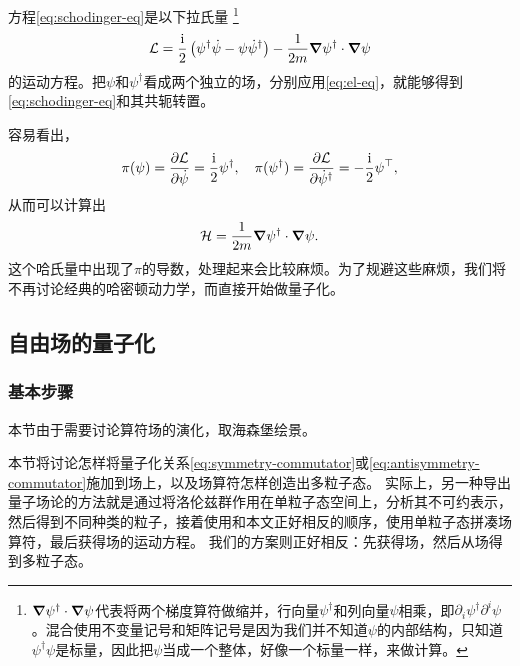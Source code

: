 \documentclass[hyperref, UTF8, a4paper]{ctexart}
\newcommand*{\ii}{\mathrm{i}}
\begin{document}
方程\eqref{eq:schodinger-eq}是以下拉氏量%
\footnote{$\grad{\psi}^\dagger \cdot \grad{\psi}$代表将两个梯度算符做缩并，行向量$\psi^\dagger$和列向量$\psi$相乘，即$\partial_i \psi^\dagger \partial^i \psi$。混合使用不变量记号和矩阵记号是因为我们并不知道$\psi$的内部结构，只知道$\psi^\dagger \psi$是标量，因此把$\psi$当成一个整体，好像一个标量一样，来做计算。}
\begin{equation}
    \mathcal{L} = \frac{\ii}{2} \left( \psi^\dagger \dot{\psi} - \psi \dot{\psi}^\dagger \right) - \frac{1}{2m} \grad{\psi^\dagger} \cdot \grad{\psi}
    \label{eq:schodinger-lagrangian}
\end{equation}
的运动方程。把$\psi$和$\psi^\dagger$看成两个独立的场，分别应用\eqref{eq:el-eq}，就能够得到\eqref{eq:schodinger-eq}和其共轭转置。

容易看出，
\[
    \pi(\psi) = \pdv{\mathcal{L}}{\dot{\psi}} = \frac{\ii}{2} \psi^\dagger, \quad \pi(\psi^\dagger) = \pdv{\mathcal{L}}{\dot{\psi}^\dagger} = - \frac{\ii}{2} \psi^\top,
\]
从而可以计算出
\begin{equation}
    \mathcal{H} = \frac{1}{2m} \grad{\psi^\dagger} \cdot \grad{\psi}.
\end{equation}
这个哈氏量中出现了$\pi$的导数，处理起来会比较麻烦。为了规避这些麻烦，我们将不再讨论经典的哈密顿动力学，而直接开始做量子化。

\subsection{自由场的量子化}\label{sec:quantization-of-free-fields}

\subsubsection{基本步骤}


本节由于需要讨论算符场的演化，取海森堡绘景。

本节将讨论怎样将量子化关系\eqref{eq:symmetry-commutator}或\eqref{eq:antisymmetry-commutator}施加到场上，以及场算符怎样创造出多粒子态。
实际上，另一种导出量子场论的方法就是通过将洛伦兹群作用在单粒子态空间上，分析其不可约表示，然后得到不同种类的粒子，接着使用和本文正好相反的顺序，使用单粒子态拼凑场算符，最后获得场的运动方程。
我们的方案则正好相反：先获得场，然后从场得到多粒子态。
\end{document}
